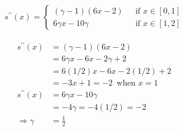 {\begin{enumerate}
\begin{align*}
s^{\prime\prime}(x) = \left\{
\begin{aligned}
(\gamma - 1)(6x - 2)
&\,\,\,\, \text{if}\,\, x\in [0,1] \\
6 \gamma x - 10 \gamma
&\,\,\,\, \text{if}\,\, x\in [1,2]
\end{aligned}
\right.
\end{align*}


\begin{align*}
s^{\prime\prime}(x) &= (\gamma - 1) (6x - 2) \\
                 &= 6 \gamma x - 6 x - 2 \gamma + 2 \\
                 &= 6 (1/2) x - 6 x - 2 (1/2) + 2\\
                 &= - 3 x + 1 = -2 \,\,\,\text{when } x=1 \\
s^{\prime\prime}(x) &= 6 \gamma x - 10 \gamma \\
                 &= - 4 \gamma = - 4 (1/2) = -2\\
     \Rightarrow \gamma &= \frac{1}{2}
\end{align*}


\end{enumerate}

}
